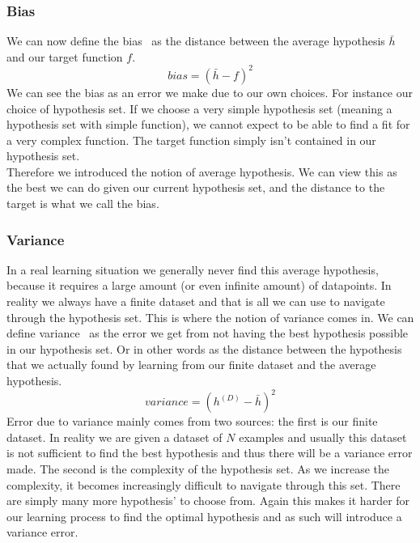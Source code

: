 \subsubsection{Bias}
We can now define the bias~\cite{caltechmachinelearning} as the distance between the average hypothesis $\bar{h}$ and our target function $f$.
$$
bias = (\bar{h} - f)^{2}
$$
We can see the bias as an error we make due to our own choices. For instance our choice of hypothesis set. If we choose a very simple hypothesis set (meaning a hypothesis set with simple function), we cannot expect to be able to find a fit for a very complex function. The target function simply isn't contained in our hypothesis set. \\
Therefore we introduced the notion of average hypothesis. We can view this as the best we can do given our current hypothesis set, and the distance to the target is what we call the bias.
\subsubsection{Variance}
In a real learning situation we generally never find this average hypothesis, because it requires a large amount (or even infinite amount) of datapoints. In reality we always have a finite dataset and that is all we can use to navigate through the hypothesis set. This is where the notion of variance comes in. We can define variance~\cite{caltechmachinelearning} as the error we get from not having the best hypothesis possible in our hypothesis set. Or in other words as the distance between the hypothesis that we actually found by learning from our finite dataset and the average hypothesis.
$$
variance = (h^{(D)} - \bar{h})^{2}
$$
Error due to variance mainly comes from two sources: the first is our finite dataset. In reality we are given a dataset of $N$ examples and usually this dataset is not sufficient to find the best hypothesis and thus there will be a variance error made. The second is the complexity of the hypothesis set. As we increase the complexity, it becomes increasingly difficult to navigate through this set. There are simply many more hypothesis' to choose from. Again this makes it harder for our learning process to find the optimal hypothesis and as such will introduce a variance error.
